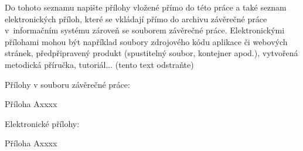 \documentclass{vdocdiplcz}
\begin{document}
\maketitlepages

\tableofcontents\clearpage

\nastavodstavec   %
\radkovani   %

\mainmatter








%



\renewcommand{\refname}{Seznam použité literatury}

\begingroup

\endgroup

%
\listoffigures\clearpage
%
\listoftables\clearpage






\clearpage
%
\clearpage
%
\appendix
%

  \rule{0pt}{1pt}\thispagestyle{empty}
    \par
    \noindent{\Huge\bfseries\scshape\appendixpagename}
    \vspace{7em}
    
Do tohoto seznamu napište přílohy vložené přímo do této práce a také seznam elektronických příloh, které se vkládají přímo do archivu závěrečné práce v informačním systému zároveň se souborem závěrečné práce. Elektronickými přílohami mohou být například soubory zdrojového kódu aplikace či webových stránek, předpřipravený produkt (spustitelný soubor, kontejner apod.), vytvořená metodická příručka, tutoriál... (tento text odstraňte)
		
\begin{citemize}
	\item Přílohy v souboru závěrečné práce:
	\begin{citemize}
		\item Příloha A\quad xxxx
		\item 
	\end{citemize}
	\item Elektronické přílohy:
	\begin{citemize}
		\item Příloha A\quad xxxx
		\item 
	\end{citemize}
\end{citemize}
    \rule{0pt}{1pt}

  \clearpage

%
\end{document}
